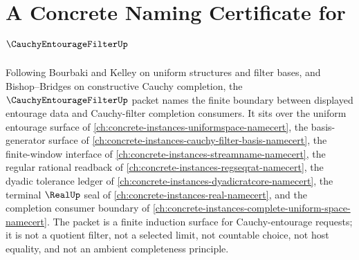 \chapter{A Concrete Naming Certificate for $\CauchyEntourageFilterUp$}
\label{ch:concrete-instances-cauchy-entourage-filter-namecert}

Following Bourbaki and Kelley on uniform structures and filter bases, and Bishop--Bridges on constructive Cauchy completion, the $\CauchyEntourageFilterUp$ packet names the finite boundary between displayed entourage data and Cauchy-filter completion consumers. It sits over the uniform entourage surface of \autoref{ch:concrete-instances-uniformspace-namecert}, the basis-generator surface of \autoref{ch:concrete-instances-cauchy-filter-basis-namecert}, the finite-window interface of \autoref{ch:concrete-instances-streamname-namecert}, the regular rational readback of \autoref{ch:concrete-instances-regseqrat-namecert}, the dyadic tolerance ledger of \autoref{ch:concrete-instances-dyadicratcore-namecert}, the terminal $\RealUp$ seal of \autoref{ch:concrete-instances-real-namecert}, and the completion consumer boundary of \autoref{ch:concrete-instances-complete-uniform-space-namecert}. The packet is a finite induction surface for Cauchy-entourage requests; it is not a quotient filter, not a selected limit, not countable choice, not host equality, and not an ambient completeness principle.

